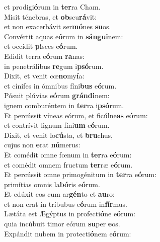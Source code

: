 \evenverse et prodigi\textbf{ó}rum in \textbf{ter}ra Cham.\\
\oddverse Misit ténebras, et \textbf{ob}scu\textbf{rá}vit:~\*\\
\oddverse et non exacerbávit ser\textbf{mó}nes \textbf{su}os.\\
\evenverse Convértit aquas e\textbf{ó}rum in \textbf{sán}\textbf{gui}nem:~\*\\
\evenverse et occídit \textbf{pi}sces e\textbf{ó}rum.\\
\oddverse Edidit terra e\textbf{ó}rum \textbf{ra}nas:~\*\\
\oddverse in penetrálibus \textbf{re}gum i\textbf{psó}rum.\\
\evenverse Dixit, et venit cœ\textbf{no}my\textbf{í}a:~\*\\
\evenverse et cínifes in ómnibus fíni\textbf{bus} e\textbf{ó}rum.\\
\oddverse Pósuit plúvias e\textbf{ó}rum \textbf{grán}\textbf{di}nem:~\*\\
\oddverse ignem comburéntem in \textbf{ter}ra i\textbf{psó}rum.\\
\evenverse Et percússit víneas eórum, et ficúlne\textbf{as} e\textbf{ó}rum:~\*\\
\evenverse et contrívit lignum fíni\textbf{um} e\textbf{ó}rum.\\
\oddverse Dixit, et venit lo\textbf{cú}sta, et \textbf{bru}chus,~\*\\
\oddverse cujus non \textbf{e}rat \textbf{nú}merus:\\
\evenverse Et comédit omne fœnum in \textbf{ter}ra e\textbf{ó}rum:~\*\\
\evenverse et comédit omnem fructum \textbf{ter}ræ e\textbf{ó}rum.\\
\oddverse Et percússit omne primogénitum in \textbf{ter}ra e\textbf{ó}rum:~\*\\
\oddverse primítias omnis la\textbf{bó}ris e\textbf{ó}rum.\\
\evenverse Et edúxit eos cum ar\textbf{gén}to et \textbf{au}ro:~\*\\
\evenverse et non erat in tríbubus e\textbf{ó}rum in\textbf{fír}mus.\\
\oddverse Lætáta est Ægýptus in profecti\textbf{ó}ne e\textbf{ó}rum:~\*\\
\oddverse quia incúbuit timor eórum \textbf{su}per \textbf{e}os.\\
\evenverse Expándit nubem in protecti\textbf{ó}nem e\textbf{ó}rum:~\*\\
